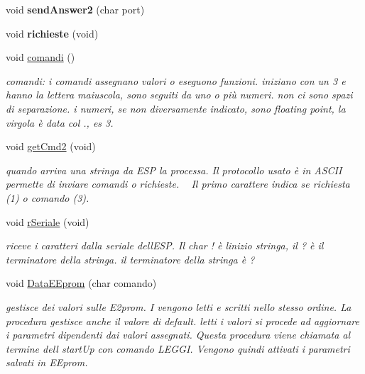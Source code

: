 \begin{DoxyCompactItemize}
\mbox{\label{ari_pi__2_d_c__esp__08_8ino_a914ee45b85c8745eaee35cdef279a276}} 
void {\bfseries send\+Answer2} (char port)
\item 
\mbox{\label{ari_pi__2_d_c__esp__08_8ino_a9d7193cecd4d57fda8e39dc98a236253}} 
void {\bfseries richieste} (void)
\item 
void \mbox{\hyperlink{ari_pi__2_d_c__esp__08_8ino_a8865513d32ebc241dbe80e5bf49ff775}{comandi}} ()
\begin{DoxyCompactList}\small\item\em comandi\+: i comandi assegnano valori o eseguono funzioni. iniziano con un 3 e hanno la lettera maiuscola, sono seguiti da uno o più numeri. non ci sono spazi di separazione. i numeri, se non diversamente indicato, sono floating point, la virgola è data col \textquotesingle{}.\textquotesingle{}, es 3. \end{DoxyCompactList}\item 
void \mbox{\hyperlink{ari_pi__2_d_c__esp__08_8ino_a64ea2b252b5ab59be204f70e2206ce1c}{get\+Cmd2}} (void)
\begin{DoxyCompactList}\small\item\em quando arriva una stringa da E\+SP la processa. Il protocollo usato è in A\+S\+C\+II permette di inviare comandi o richieste. ~\newline
 Il primo carattere indica se richiesta (1) o comando (3). \end{DoxyCompactList}\item 
void \mbox{\hyperlink{ari_pi__2_d_c__esp__08_8ino_ae29b9282fc7ede860a2bb8984ad0560c}{r\+Seriale}} (void)
\begin{DoxyCompactList}\small\item\em riceve i caratteri dalla seriale dell\textquotesingle{}E\+SP. Il char \textquotesingle{}!\textquotesingle{} è l\textquotesingle{}inizio stringa, il \textquotesingle{}?\textquotesingle{} è il terminatore della stringa. il terminatore della stringa è ? \end{DoxyCompactList}\item 
void \mbox{\hyperlink{ari_pi__2_d_c__esp__08_8ino_a24f4d37ce4673eadaa4043cf6ecaff27}{Data\+E\+Eprom}} (char comando)
\begin{DoxyCompactList}\small\item\em gestisce dei valori sulle E2prom. I vengono letti e scritti nello stesso ordine. La procedura gestisce anche il valore di default. letti i valori si procede ad aggiornare i parametri dipendenti dai valori assegnati. Questa procedura viene chiamata al termine dell\textquotesingle{} start\+Up con comando L\+E\+G\+GI. Vengono quindi attivati i parametri salvati in E\+Eprom. \end{DoxyCompactList}\item 

\end{DoxyCompactItemize}
